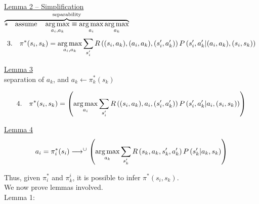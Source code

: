 \textasteriskcentered \quad \underline{Lemma 2 -- Simplification}\\

$\overbrace{\ast\quad\text{assume} \quad \operatorname*{arg\,max}_{a_i,a_k} \equiv \operatorname*{arg\,max}_{a_i} \operatorname*{arg\,max}_{a_k}}^{\text{separability}}$\\

 \begin{equation*}
3.\quad\pi^\ast(s_i, s_k) = \operatorname*{arg\,max}_{a_i, a_k} \sum_{s^\prime_i}  R\left((s_i, a_k), (a_i,a_k),(s^\prime_i, a^\prime_k) \right) P\left( s^\prime_i, a^\prime_k \middle| (a_i,a_k),  (s_i, s_k) \right) 
\end{equation*}

\underline{Lemma 3}\\

\textasteriskcentered \quad separation of $a_k$, and $a_k \leftarrow \pi^{\ast}_k(s_k)$

 \begin{equation*}
4.\quad\pi^\ast(s_i, s_k) =\left( \operatorname*{arg\,max}_{a_i} \sum_{s^\prime_i}  R\left((s_i, a_k), a_i,(s^\prime_i, a^\prime_k) \right) P\left( s^\prime_i, a^\prime_k \middle| a_i,  (s_i, s_k) \right) \right)
\end{equation*}

\textasteriskcentered \quad \underline{Lemma 4}\\

\begin{equation*}
a_i = \pi^\ast_i(s_i) \longrightarrow^{\cup} \left( \operatorname*{arg\,max}_{a_k} \sum_{s^\prime_k}  R\left(s_k, a_k, s^\prime_k, a^\prime_k \right) P\left( s^\prime_k \middle| a_k, s_k \right) \right)
\end{equation*}

\begin{center}
\end{center}

Thus, given $\pi^\ast_i$ and $\pi^{i}_{k}$, it is possible to infer $\pi^\ast \left( s_i, s_k \right)$.\\

We now prove lemmas involved.\\

Lemma 1:\\
\vspace*{4cm}

